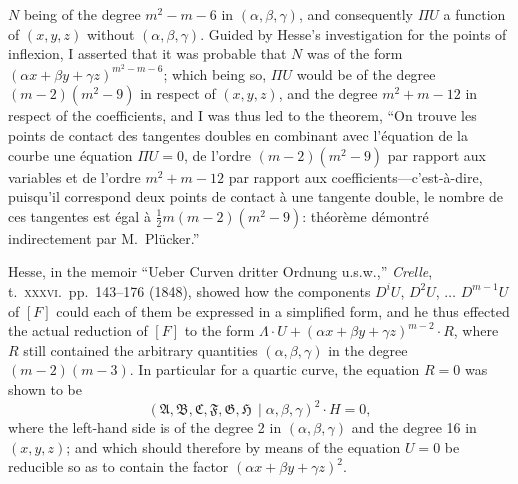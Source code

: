 \documentclass[11pt]{article}
\newcommand{\Cdel}{\mid}
\begin{document}
\noindent $N$ being of the degree $m^2 - m - 6$ in $(\alpha, \beta, \gamma)$, and consequently $\Pi U$ a function of $(x, y, z)$ without $(\alpha, \beta, \gamma)$. Guided by Hesse's investigation for the points of inflexion, I asserted that it was probable that $N$ was of the form $(\alpha x + \beta y + \gamma z)^{m^2-m-6}$; which being so, $\Pi U$ would be of the degree $(m-2)(m^2-9)$ in respect of $(x, y, z)$, and the degree $m^2 + m - 12$ in respect of the coefficients, and I was thus led to the theorem, ``On trouve les points de contact des tangentes doubles en combinant avec l'\'equation de la courbe une \'equation $\Pi U = 0$, de l'ordre $(m-2)(m^2-9)$ par rapport aux variables et de l'ordre $m^2 + m - 12$ par rapport aux coefficients---c'est-\`a-dire, puisqu'il correspond deux points de contact \`a une tangente double, le nombre de ces tangentes est \'egal \`a $\tfrac{1}{2}m(m-2)(m^2-9)$: th\'eor\`eme d\'emontr\'e indirectement par M.~Pl\"ucker.''

Hesse, in the memoir ``Ueber Curven dritter Ordnung u.s.w.,'' \textit{Crelle}, t.~\textsc{xxxvi}.~pp.~143--176 (1848), showed how the components $D^iU$, $D^2U$, $\ldots$ $D^{m-1}U$ of $[F]$ could each of them be expressed in a simplified form, and he thus effected the actual reduction of $[F]$ to the form $\Lambda \cdot U + (\alpha x + \beta y + \gamma z)^{m-2} \cdot R$, where $R$ still contained the arbitrary quantities $(\alpha, \beta, \gamma)$ in the degree $(m-2)(m-3)$. In particular for a quartic curve, the equation $R = 0$ was shown to be
\[
(\mathfrak{A}, \mathfrak{B}, \mathfrak{C}, \mathfrak{F}, \mathfrak{G}, \mathfrak{H}\,\Cdel\alpha, \beta, \gamma)^2 \cdot H = 0,
\]
where the left-hand side is of the degree 2 in $(\alpha, \beta, \gamma)$ and the degree 16 in $(x, y, z)$; and which should therefore by means of the equation $U = 0$ be reducible so as to contain the factor $(\alpha x + \beta y + \gamma z)^2$.
\end{document}
